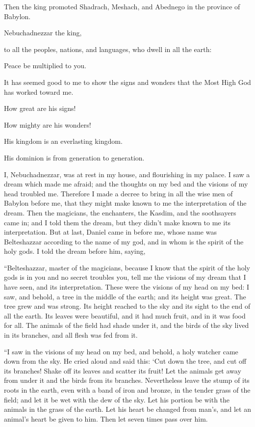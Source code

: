 \myverse{}Then the king promoted Shadrach, Meshach, and Abednego in the
province of Babylon.


\mychapter{} \myverse*{}Nebuchadnezzar the king,

to all the peoples, nations, and languages, who dwell in all the earth:

Peace be multiplied to you.

\myverse{}It has seemed good to me to show the signs and wonders
that the Most High God has worked toward me.

\myverse{}How great are his signs!

How mighty are his wonders!

His kingdom is an everlasting kingdom.

His dominion is from generation to generation.

\myverse{}I, Nebuchadnezzar, was at rest in my house, and flourishing
in my palace.
\myverse{}I saw a dream which made me afraid; and the thoughts on my bed and the visions
of my head troubled me.
\myverse{}Therefore I made a decree to bring in all the wise men of Babylon before me,
that they might make known to me the interpretation of the dream.
\myverse{}Then the magicians, the enchanters, the Kasdim, and the soothsayers came in;
and I told them the dream, but they didn’t make known to me its interpretation.
\myverse{}But at last, Daniel came in before me, whose name was Belteshazzar according
to the name of my god, and in whom is the spirit of the holy gods. I told the dream before him, saying,

\myverse{}“Belteshazzar, master of the magicians, because I know
that the spirit of the holy gods is in you and no secret troubles you, tell me the visions of my dream
that I have seen, and its interpretation.
\myverse{}These were the visions of my head on my bed: I saw, and behold, a tree in
the middle of the earth; and its height was great.
\myverse{}The tree grew and was strong. Its height reached to the sky and its sight
to the end of all the earth.
\myverse{}Its leaves were beautiful, and it had much fruit, and in it was food for all.
The animals of the field had shade under it, and the birds of the sky lived in its branches, and all flesh
was fed from it.

\myverse{}“I saw in the visions of my head on my bed, and behold,
a holy watcher came down from the sky.
\myverse{}He cried aloud and said this: ‘Cut down the tree, and cut off its branches!
Shake off its leaves and scatter its fruit! Let the animals get away from under it and the birds from
its branches.
\myverse{}Nevertheless leave the stump of its roots in the earth, even with a band of
iron and bronze, in the tender grass of the field; and let it be wet with the dew of the sky. Let his
portion be with the animals in the grass of the earth.
\myverse{}Let his heart be changed from man’s, and let an animal’s heart be given to
him. Then let seven times pass over him.

